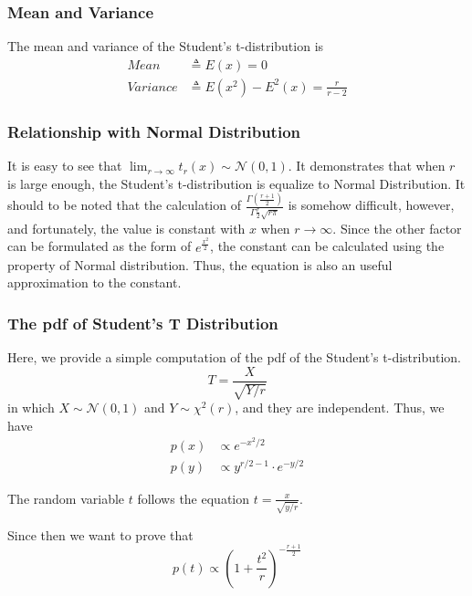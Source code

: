 \subsubsection{Mean and Variance}

The mean and variance of the Student's t-distribution is
\begin{align*}
    Mean     & \triangleq E(x) = 0                        \\
    Variance & \triangleq E(x^2) - E^2(x) = \frac{r}{r-2}
\end{align*}

\subsubsection{Relationship with Normal Distribution}

It is easy to see that $\lim_{r \to \infty} t_r(x) \sim \mathcal{N}(0, 1)$.
It demonstrates that when $r$ is large enough, the Student's t-distribution is equalize to Normal Distribution.
It should to be noted that the calculation of $\frac{\Gamma(\frac{r+1}{2})}{\Gamma{\frac{r}{2}} \sqrt{r \pi}}$ is somehow difficult,
however, and fortunately, the value is constant with $x$ when $r \rightarrow \infty$.
Since the other factor can be formulated as the form of $e^\frac{x^2}{2}$,
the constant can be calculated using the property of Normal distribution.
Thus, the equation is also an useful approximation to the constant.

\subsubsection{The pdf of Student's T Distribution}

Here, we provide a simple computation of the pdf of the Student's t-distribution.
\begin{equation*}
    T=\frac{X}{\sqrt{Y/r}}
\end{equation*}
in which $X \sim \mathcal{N}(0, 1)$ and $Y \sim \chi^2(r)$, and they are independent.
Thus, we have
\begin{align*}
    p(x) & \propto e^{-x^2/2}               \\
    p(y) & \propto y^{r/2-1} \cdot e^{-y/2}
\end{align*}

The random variable $t$ follows the equation $t=\frac{x}{\sqrt{y/r}}$.

\begin{lemma} \label{lemma: Compute the Pdf of Student's T Distribution}
    Since then we want to prove that
    \begin{equation}
        p(t) \propto (1+\frac{t^2}{r})^{-\frac{r+1}{2}}
    \end{equation}

\end{lemma}

